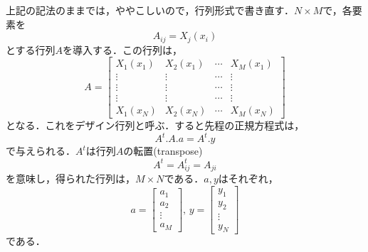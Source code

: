 上記の記法のままでは，ややこしいので，行列形式で書き直す．$N \times M$で，各要素を
\begin{equation*}
A_{ij} = X_j(x_i)
\end{equation*}
とする行列$A$を導入する．この行列は，
\begin{equation*}
A=\left[
\begin{array}{cccc}
X_1(x_1) & X_2(x_1) & \cdots & X_M(x_1) \\
\vdots & \vdots & \cdots & \vdots \\
\vdots & \vdots & \cdots & \vdots \\
\vdots & \vdots & \cdots & \vdots \\
X_1(x_N) & X_2(x_N) & \cdots & X_M(x_N) 
\end{array}
\right]
\end{equation*}
となる．これをデザイン行列と呼ぶ．すると先程の正規方程式は，
\begin{equation*}
A^t . A . a = A^t . y
\end{equation*}
で与えられる．$A^t$は行列$A$の転置(transpose)
\begin{equation*}
A^t = A_{ij}^t = A_{ji}
\end{equation*}
を意味し，得られた行列は，$M \times N$である．$a, y$はそれぞれ，
\begin{equation*}
a=\left[
\begin{array}{c}
a_1\\a_2\\\vdots\\a_M
\end{array}
\right],\,
y=\left[
\begin{array}{c}
y_1\\y_2\\\vdots\\y_N
\end{array}
\right]
\end{equation*}
である．

